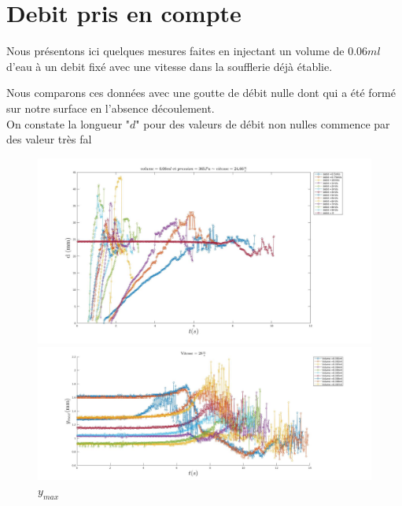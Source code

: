 \section{Debit pris en compte}

Nous présentons ici quelques mesures faites en injectant un volume de $0.06ml$ d'eau  à un debit fixé avec une vitesse dans la soufflerie déjà établie.

Nous comparons ces données avec une goutte de débit nulle dont qui a été formé sur notre surface en l'absence découlement.\\


On constate la longueur "$d$" pour des valeurs de débit non nulles commence par des valeur très fal

\begin{figure}[!h]
	\centering
	\begin{minipage}{0.95\linewidth}
	\includegraphics[width = \linewidth]{./image/p=365_vol=006d.jpg}
	\caption{$d$}
	\end{minipage}
	\begin{minipage}{0.95\linewidth}
	\includegraphics[width = \linewidth]{./image/v=28ym.jpg}
	\caption{$y_{max}$}
	\end{minipage}
\end{figure}
